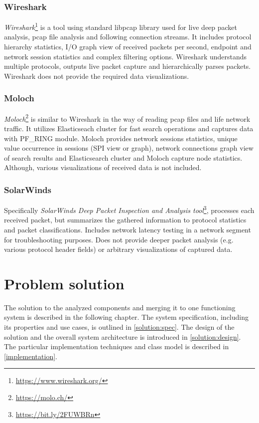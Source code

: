 \documentclass[12pt,a4paper,twoside]{book}
\begin{document}
        \subsection{Wireshark} \label{analysis:solutions:wireshark}
            \emph{Wireshark}\footnote{\url{https://www.wireshark.org/}} is a tool using standard libpcap library used for live deep packet analysis, pcap file analysis and following connection streams. It includes protocol hierarchy statistics, I/O graph view of received packets per second, endpoint and network session statistics and complex filtering options. Wireshark understands multiple protocols, outputs live packet capture and hierarchically parses packets. Wireshark does not provide the required data visualizations.
        \subsection{Moloch} \label{analysis:solutions:moloch}
            \emph{Moloch}\footnote{\url{https://molo.ch/}} is similar to Wireshark in the way of reading pcap files and life network traffic. It utilizes Elasticseach cluster for fast search operations and captures data with PF\_RING module. Moloch provides network sessions statistics, unique value occurrence in sessions (SPI view or graph), network connections graph view of search results and Elasticsearch cluster and Moloch capture node statistics. Although, various visualizations of received data is not included.
        \subsection{SolarWinds} \label{analysis:solutions:solarwinds}
            Specifically \emph{SolarWinds Deep Packet Inspection and Analysis tool}\footnote{\url{https://bit.ly/2FUWBRn}}, processes each received packet, but summarizes the gathered information to protocol statistics and packet classifications. Includes network latency testing in a network segment for troubleshooting purposes. Does not provide deeper packet analysis (e.g. various protocol header fields) or arbitrary visualizations of captured data.\par
\chapter{Problem solution} \label{solution}
    The solution to the analyzed components and merging it to one functioning system is described in the following chapter. The system specification, including its properties and use cases, is outlined in \autoref{solution:spec}. The design of the solution and the overall system architecture is introduced in \autoref{solution:design}. The particular implementation techniques and class model is described in \autoref{implementation}.
\end{document}

